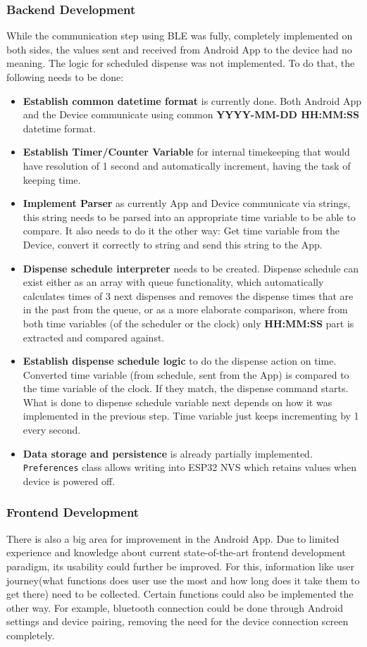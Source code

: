 \subsubsection{Backend Development}
While the communication step using \ac{BLE} was fully, completely implemented on both sides, the values sent and received from Android App to the device had no meaning. The logic for scheduled dispense was not implemented. To do that, the following needs to be done:
\begin{itemize}
	\item \textbf{Establish common datetime format} is currently done. Both Android App and the Device communicate using common \textbf{YYYY-MM-DD HH:MM:SS} datetime format.
	\item \textbf{Establish Timer/Counter Variable} for internal timekeeping that would have resolution of 1 second and automatically increment, having the task of keeping time.
	\item \textbf{Implement Parser} as currently App and Device communicate via strings, this string needs to be parsed into an appropriate time variable to be able to compare. It also needs to do it the other way: Get time variable from the Device, convert it correctly to string and send this string to the App.
	\item \textbf{Dispense schedule interpreter} needs to be created. Dispense schedule can exist either as an array with queue functionality, which automatically calculates times of 3 next dispenses and removes the dispense times that are in the past from the queue, or as a more elaborate comparison, where from both time variables (of the scheduler or the clock) only \textbf{HH:MM:SS} part is extracted and compared against.
	\item \textbf{Establish dispense schedule logic} to do the dispense action on time. Converted time variable (from schedule, sent from the App) is compared to the time variable of the clock. If they match, the dispense command starts. What is done to dispense schedule variable next depends on how it was implemented in the previous step. Time variable just keeps incrementing by 1 every second.
	\item \textbf{Data storage and persistence} is already partially implemented. \texttt{Preferences} class allows writing into ESP32 \ac{NVS} which retains values when device is powered off.
\end{itemize}

\subsubsection{Frontend Development}
There is also a big area for improvement in the Android App. Due to limited experience and knowledge about current state-of-the-art frontend development paradigm, its usability could further be improved. For this, information like user journey(what functions does user use the most and how long does it take them to get there) need to be collected. Certain functions could also be implemented the other way. For example, bluetooth connection could be done through Android settings and device pairing, removing the need for the device connection screen completely.

